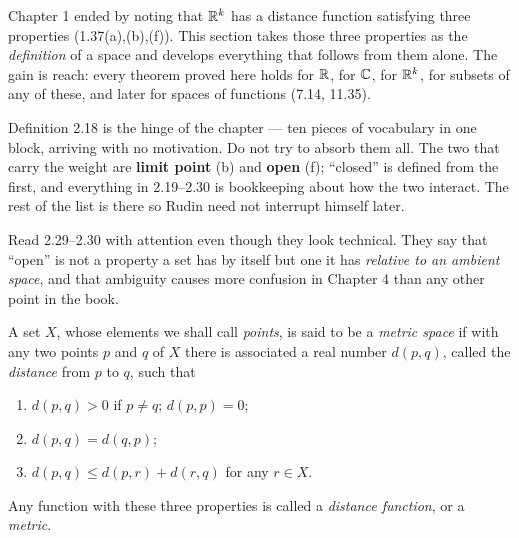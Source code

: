 
\begin{signpost}
Chapter 1 ended by noting that $\mathbb{R}^k$ has a distance function satisfying three
properties (1.37(a),(b),(f)). This section takes those three properties as the
\emph{definition} of a space and develops everything that follows from them
alone. The gain is reach: every theorem proved here holds for $\mathbb{R}$, for $\mathbb{C}$,
for $\mathbb{R}^k$, for subsets of any of these, and later for spaces of functions
(7.14, 11.35).

\smallskip
Definition 2.18 is the hinge of the chapter --- ten pieces of vocabulary in one
block, arriving with no motivation. Do not try to absorb them all. The two that
carry the weight are \textbf{limit point} (b) and \textbf{open} (f); ``closed''
is defined from the first, and everything in 2.19--2.30 is bookkeeping about
how the two interact. The rest of the list is there so Rudin need not
interrupt himself later.

\smallskip
Read 2.29--2.30 with attention even though they look technical. They say that
``open'' is not a property a set has by itself but one it has \emph{relative to
an ambient space}, and that ambiguity causes more confusion in Chapter 4 than
any other point in the book.
\end{signpost}

A set $X$, whose elements we shall call \emph{points}, is said to be a
\emph{metric space} if with any two points $p$ and $q$ of $X$ there is
associated a real number $d(p,q)$, called the \emph{distance} from $p$ to $q$,
such that
\begin{enumerate}[label=(\alph*), leftmargin=2.2em, itemsep=1pt, topsep=3pt]
  \item $d(p,q) > 0$ if $p \ne q$; $d(p,p) = 0$;
  \item $d(p,q) = d(q,p)$;
  \item $d(p,q) \le d(p,r) + d(r,q)$ for any $r \in X$.
\end{enumerate}
Any function with these three properties is called a \emph{distance function},
or a \emph{metric}.

